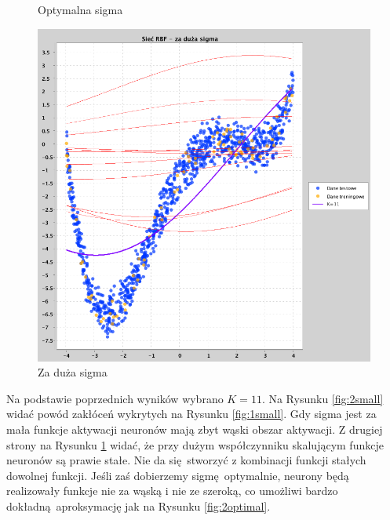 \documentclass[a4paper, portrait,11pt]{article}
\begin{document}
\begin{figure}[!htb]
\begin{minipage}{0.33\textwidth}
    \caption{\label{fig:2optimal}Optymalna sigma}
  \end{minipage}
  \begin{minipage}{0.33\textwidth}
    \centering
    \includegraphics[width=1\linewidth]{../data/approximation3/2/big.png}
    \caption{\label{fig:2big}Za duża sigma}
  \end{minipage}\hfill
\end{figure}
Na podstawie poprzednich wyników wybrano $K=11$. Na Rysunku \ref{fig:2small} widać powód zakłóceń wykrytych na Rysunku \ref{fig:1small}.
Gdy sigma jest za mała funkcje aktywacji neuronów mają zbyt wąski obszar aktywacji.
Z drugiej strony na Rysunku \ref{fig:2big} widać, że przy dużym współczynniku skalującym funkcje neuronów są prawie stałe.
Nie da się stworzyć z kombinacji funkcji stałych dowolnej funkcji.
Jeśli zaś dobierzemy sigmę optymalnie, neurony będą realizowały funkcje nie za wąską i nie ze szeroką, co umożliwi bardzo dokładną aproksymację jak na Rysunku \ref{fig:2optimal}.
\end{document}
